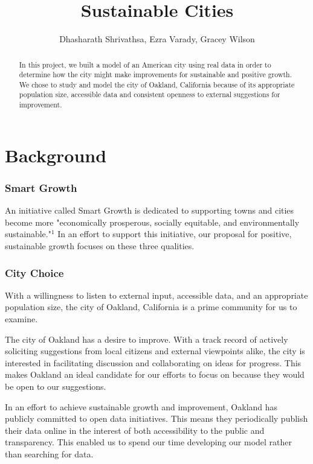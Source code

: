 \documentclass[]{report}
\title{Sustainable Cities}
\author{Dhasharath Shrivathsa, Ezra Varady, Gracey Wilson}
\begin{document}
\maketitle
\tableofcontents

\begin{abstract}
		In this project, we built a model of an American city using real data in order to determine how the city might make improvements for sustainable and positive growth. We chose to study and model the city of Oakland, California because of its appropriate population size, accessible data and consistent openness to external suggestions for improvement.
	
\end{abstract}

\part{Background}
	\section{Smart Growth}
	An initiative called Smart Growth is dedicated to supporting towns and cities become more "economically prosperous, socially equitable, and environmentally	sustainable."$^{1}$ In an effort to support this initiative, our proposal for positive, sustainable growth focuses on these three qualities. 

	
	\section{City Choice}
	With a willingness to listen to external input, accessible data, and an appropriate population size, the city of Oakland, California is a prime community for us to examine.
		
	The city of Oakland has a desire to improve. With a track record of actively soliciting suggestions from local citizens and external viewpoints alike, the city is interested in facilitating discussion and collaborating on ideas for progress. This makes Oakland an ideal candidate for our efforts to focus on because they would be open to our suggestions.
	
	In an effort to achieve sustainable growth and improvement, Oakland has publicly committed to open data initiatives. This means they periodically publish their data online in the interest of both accessibility to the public and transparency. This enabled us to spend our time developing our model rather than searching for data.
		
\end{document}
